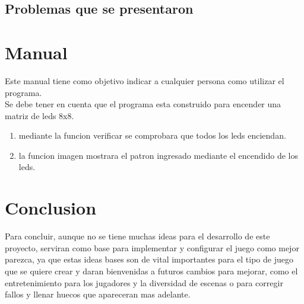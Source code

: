 \documentclass{article}
\begin{document}
\subsection{Problemas que se presentaron}
\section{Manual}
Este manual tiene como objetivo indicar a cualquier persona como utilizar el programa.\\
Se debe tener en cuenta que el programa esta construido para encender una matriz de leds 8x8.\\
\begin{enumerate}
    \item mediante la funcion verificar se comprobara que todos los leds enciendan.\\
    \item la funcion imagen mostrara el patron ingresado mediante el encendido de los leds.
\end{enumerate}



\newpage
\section{Conclusion} \label{conclusion}
Para concluir, aunque no se tiene muchas ideas para el desarrollo de este proyecto, serviran como base para implementar y configurar el juego como mejor parezca, ya que estas ideas bases son de vital importantes para el tipo de juego que se quiere crear y daran bienvenidas a futuros cambios para mejorar, como el entretenimiento para los jugadores y la diversidad de escenas o para corregir fallos y llenar huecos que apareceran mas adelante.
\end{document}
